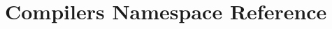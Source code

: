\hypertarget{namespaceCompilers}{\section{Compilers Namespace Reference}
\label{namespaceCompilers}
}
